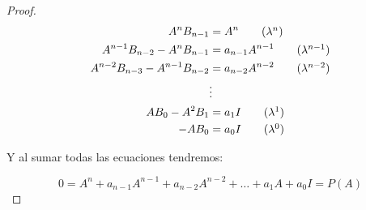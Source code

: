 \begin{proof}
		\begin{align*}
			A^n B_{n-1} &= A^n \tag{$\lambda^n$} \\
			A^{n-1} B_{n-2} - A^n B_{n-1} &= a_{n-1} A^{n-1} \tag{$\lambda^{n-1}$} \\
			A^{n-2} B_{n-3} - A^{n-1} B_{n-2} &= a_{n-2} A^{n-2} \tag{$\lambda^{n-2}$} \\
			&\vdots \\
			A B_0 - A^2 B_1 &= a_1 I \tag{$\lambda^1$} \\
			- A B_0 &= a_0 I \tag{$\lambda^0$}
		\end{align*}

		Y al sumar todas las ecuaciones tendremos:

		\begin{equation*}
			0 = A^n + a_{n-1} A^{n-1} + a_{n-2} A^{n-2} + \dots + a_1 A + a_0 I = P(A)
		\end{equation*}
	\end{proof}

